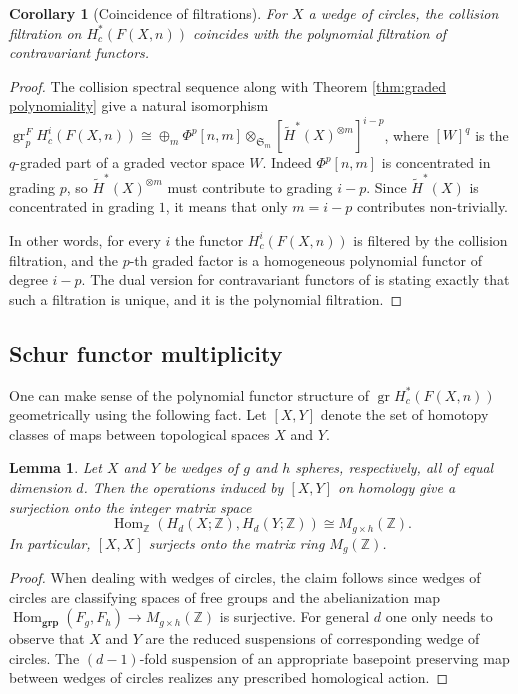 \documentclass[12pt]{article}
\newcommand{\Z}{\mathbb{Z}}
\newcommand{\SymGroup}[1][n]{\mathfrak{S}_{#1}}
\DeclareMathOperator{\gr}{gr}
\DeclareMathOperator{\Hom}{Hom}
\theoremstyle{plain}
\newtheorem{lem}[thm]{Lemma}
\newtheorem{cor}[thm]{Corollary}
\theoremstyle{definition}
\theoremstyle{remark}
\begin{document}
\begin{cor}[Coincidence of filtrations]
    For $X$ a wedge of circles, the collision filtration on $H^*_c(F(X,n))$ coincides with the polynomial filtration of contravariant functors.
\end{cor}
\begin{proof}
The collision spectral sequence along with Theorem \ref{thm:graded polynomiality} give a natural isomorphism $\gr_p^F H^i_c(F(X,n)) \cong \oplus_m \Phi^p[n,m]\otimes_{\SymGroup[m]}\left[\tilde{H}^*(X)^{\otimes m}\right]^{i-p} $, where $[W]^{q}$ is the $q$-graded part of a graded vector space $W$. Indeed $\Phi^p[n,m]$ is concentrated in grading $p$, so $\tilde{H}^*(X)^{\otimes m}$ must contribute to grading $i-p$. Since $\tilde{H}^*(X)$ is concentrated in grading $1$, it means that only $m=i-p$ contributes non-trivially.

In other words, for every $i$ the functor $H^i_c(F(X,n))$ is filtered by the collision filtration, and the $p$-th graded factor is a homogeneous polynomial functor of degree $i-p$. The dual version for contravariant functors of \cite[Remark 6.10]{PV18} is stating exactly that such a filtration is unique, and it is the polynomial filtration. 
\end{proof}


\subsection{Schur functor multiplicity}
One can make sense of the polynomial functor structure of $\gr H^*_c(F(X,n))$ geometrically using the following fact. Let $[X,Y]$ denote the set of homotopy classes of maps between topological spaces $X$ and $Y$.

\begin{lem}
    Let $X$ and $Y$ be wedges of $g$ and $h$ spheres, respectively, all of equal dimension $d$. Then the operations induced by $[X,Y]$ on homology give a surjection onto the integer matrix space 
    \[
     \Hom_{\Z}(H_d(X;\Z),H_d(Y;\Z))\cong M_{g\times h}(\Z).
    \]
    In particular, $[X,X]$ surjects onto the matrix ring $M_g(\Z)$.
\end{lem}

\begin{proof}
    When dealing with wedges of circles, the claim follows since wedges of circles are classifying spaces of free groups and the abelianization map $\Hom_{\bm{grp}}(F_g, F_h)\to M_{g\times h}(\Z)$ is surjective. For general $d$ one only needs to observe that $X$ and $Y$ are the reduced suspensions of corresponding wedge of circles. The $(d-1)$-fold suspension of an appropriate basepoint preserving map between wedges of circles realizes any prescribed homological action.
\end{proof}
\end{document}
